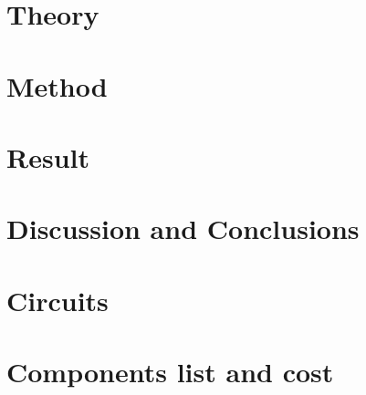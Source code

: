 \documentclass{article}
\begin{document}
\newpage
\section{Theory}




\section{Method}




\section{Result}







\section{Discussion and Conclusions}

\newpage
\appendix
%
\section{Circuits}\label{circpart}

\section{Components list and cost}

\newpage
\printbibliography %
\end{document}
